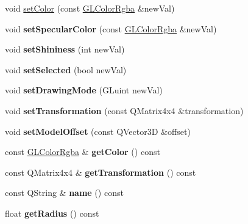 \begin{DoxyCompactItemize}
\item 
void \mbox{\hyperlink{class_g_l_body_a6101fd66bc1bfcd8dabed690b87c0d78}{set\+Color}} (const \mbox{\hyperlink{class_g_l_color_rgba}{G\+L\+Color\+Rgba}} \&new\+Val)
\item 
\mbox{\label{class_g_l_body_a90028e76cb59d81178a9a73eccffd4b1}} 
void {\bfseries set\+Specular\+Color} (const \mbox{\hyperlink{class_g_l_color_rgba}{G\+L\+Color\+Rgba}} \&new\+Val)
\item 
\mbox{\label{class_g_l_body_a7f049343daaedfc9672448a8cd4bd3e2}} 
void {\bfseries set\+Shininess} (int new\+Val)
\item 
\mbox{\label{class_g_l_body_a120b454d3d359022d4e74ba58b9b5a7b}} 
void {\bfseries set\+Selected} (bool new\+Val)
\item 
\mbox{\label{class_g_l_body_ad13e6bd35c8796d7cb3ddc69eb87f85f}} 
void {\bfseries set\+Drawing\+Mode} (G\+Luint new\+Val)
\item 
\mbox{\label{class_g_l_body_a3f49f95804f8635125f107e319a38a01}} 
void {\bfseries set\+Transformation} (const Q\+Matrix4x4 \&transformation)
\item 
\mbox{\label{class_g_l_body_a44b1012b09a4b74e4edce7542091b97d}} 
void {\bfseries set\+Model\+Offset} (const Q\+Vector3D \&offset)
\item 
\mbox{\label{class_g_l_body_aee8dcce60e8a36f49572e83bf0600ee2}} 
const \mbox{\hyperlink{class_g_l_color_rgba}{G\+L\+Color\+Rgba}} \& {\bfseries get\+Color} () const
\item 
\mbox{\label{class_g_l_body_ab6bd6c800df50d3f41af3a135b94080b}} 
const Q\+Matrix4x4 \& {\bfseries get\+Transformation} () const
\item 
\mbox{\label{class_g_l_body_af9f19479127cf12562fa0a2f9b5276f4}} 
const Q\+String \& {\bfseries name} () const
\item 
\mbox{\label{class_g_l_body_aed77f06dadb7846e9f1fac0b9a99d482}} 
float {\bfseries get\+Radius} () const

\end{DoxyCompactItemize}
